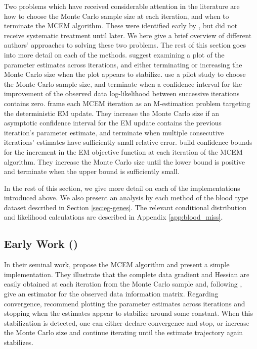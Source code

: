\documentclass[11pt, oneside]{article}   	%
\begin{document}
Two problems which have received considerable attention in the literature are how to choose the Monte Carlo sample size at each iteration, and when to terminate the MCEM algorithm. These were identified early by \citet{Wei90}, but did not receive systematic treatment until later. We here give a brief overview of different authors' approaches to solving these two problems. The rest of this section goes into more detail on each of the methods. \citet{Wei90} suggest examining a plot of the parameter estimates across iterations, and either terminating or increasing the Monte Carlo size when the plot appears to stabilize. \citet{Cha95} use a pilot study to choose the Monte Carlo sample size, and terminate when a confidence interval for the improvement of the observed data log-likelihood between successive iterations contains zero. \citet{Boo99} frame each MCEM iteration as an M-estimation problem targeting the deterministic EM update. They increase the Monte Carlo size if an asymptotic confidence interval for the EM update contains the previous iteration's parameter estimate, and terminate when multiple consecutive iterations' estimates have sufficiently small relative error. \citet{Caf05} build confidence bounds for the increment in the EM objective function at each iteration of the MCEM algorithm. They increase the Monte Carlo size until the lower bound is positive and terminate when the upper bound is sufficiently small.

In the rest of this section, we give more detail on each of the implementations introduced above. We also present an analysis by each method of the blood type dataset described in Section \ref{sec:eg-genes}. The relevant conditional distribution and likelihood calculations are described in Appendix \ref{app:blood_miss}.

\subsection{Early Work (\citealp{Wei90})}

In their seminal work, \citet{Wei90} propose the MCEM algorithm and present a simple implementation. They illustrate that the complete data gradient and Hessian are easily obtained at each iteration from the Monte Carlo sample and, following \citet{Lou82}, give an estimator for the observed data information matrix. Regarding convergence, \citeauthor{Wei90} recommend plotting the parameter estimates across iterations and stopping when the estimates appear to stabilize around some constant. When this stabilization is detected, one can either declare convergence and stop, or increase the Monte Carlo size and continue iterating until the estimate trajectory again stabilizes.
\end{document}
